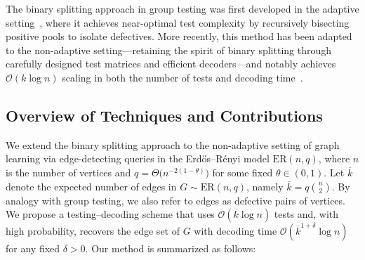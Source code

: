 \documentclass[journal]{IEEEtran}
\theoremstyle{definition}
\theoremstyle{definition}
\newcommand{\kb}{\overline{k}}
\newcommand{\bigO}{\mathcal{O}}
\begin{document}
The binary splitting approach in group testing was first developed in the adaptive setting~\cite{hwang1972method}, where it achieves near-optimal test complexity by recursively bisecting positive pools to isolate defectives. More recently, this method has been adapted to the non\mbox{-}adaptive setting—retaining the spirit of binary splitting through carefully designed test matrices and efficient decoders—and notably achieves $\bigO(k \log n)$ scaling in both the number of tests and decoding time~\cite{price2020fast,cheraghchi2020combinatorial, price2023fast,wang2023quickly}. 
 



\subsection{Overview of Techniques and Contributions}

We extend the binary splitting approach to the non-adaptive setting of graph learning via edge-detecting queries in the Erd\H{o}s--R\'enyi model
\(\mathrm{ER}(n,q)\), where \(n\) is the number of vertices and \(q=\Theta\bigl(n^{-2(1-\theta)}\bigr)\) for some fixed
\(\theta\in(0,1)\). Let \(\kb\) denote the expected number of edges in \(G\sim \mathrm{ER}(n,q)\), namely \(\kb=q\binom{n}{2}\). By analogy with
group testing, we also refer to edges as defective pairs of vertices. We propose a testing--decoding scheme that uses \(\bigO(\kb\log n)\)
tests and, with high probability, recovers the edge set of \(G\) with decoding time \(\bigO(\kb^{1+\delta}\log n)\) for any fixed
\(\delta>0\). Our method is summarized as follows:
\end{document}
